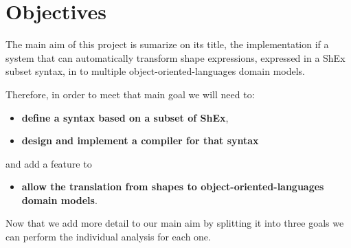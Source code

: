 \section{Objectives}

The main aim of this project is sumarize on its title, the implementation if a system that can
automatically transform shape expressions, expressed in a ShEx subset syntax, in to multiple
object-oriented-languages domain models.

Therefore, in order to meet that main goal we will need to:
\begin{itemize}
    \item \textbf{define a syntax based on a subset of ShEx},
    \item \textbf{design and implement a compiler for that syntax}
\end{itemize}
and add a feature to
\begin{itemize}
    \item \textbf{allow the translation from shapes to object-oriented-languages domain models}.
\end{itemize}

Now that we add more detail to our main aim by splitting it into three goals we can perform the individual
analysis for each one.